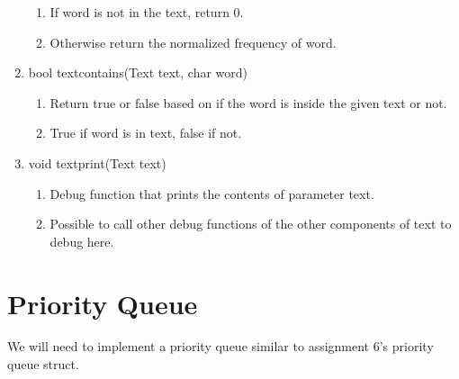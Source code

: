 \documentclass[11pt]{article}
\begin{document}
\begin{enumerate}
\begin{enumerate}
	\item If word is not in the text, return 0.
	\item Otherwise return the normalized frequency of word.
	\end{enumerate}
\item bool textcontains(Text text, char word)
	\begin{enumerate}
	\item Return true or false based on if the word is inside the given text or not.
	\item True if word is in text, false if not.
	\end{enumerate}
\item void textprint(Text text)
	\begin{enumerate}
	\item Debug function that prints the contents of parameter text.
	\item Possible to call other debug functions of the other components of text to debug here.
	\end{enumerate}
\end{enumerate}

\section{Priority Queue}\label{ss:pq}
We will need to implement a priority queue similar to assignment 6's priority queue struct.
\end{document}
